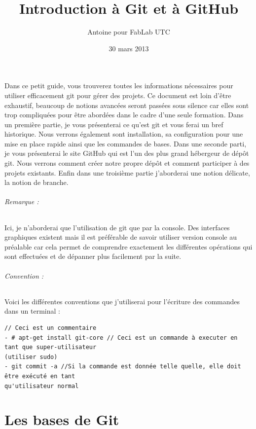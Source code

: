 \documentclass[a4paper]{article}
\title{Introduction à Git et à GitHub}
\author{Antoine \bsc{Wacheux} pour FabLab UTC}
\date{30 mars 2013}
\begin{document}
\maketitle

Dans ce petit guide, vous trouverez toutes les informations nécessaires pour utiliser efficacement git pour gérer des projets. Ce document est loin d'être exhaustif, beaucoup de notions avancées seront passées sous silence car elles sont trop compliquées pour être abordées dans le cadre d'une seule formation. Dans un première partie, je vous présenterai ce qu'est git et vous ferai un bref historique. Nous verrons également sont installation, sa configuration pour une mise en place rapide ainsi que les commandes de bases. Dans une seconde parti, je vous présenterai le site GitHub qui est l'un des plus grand hébergeur de dépôt git. Nous verrons comment créer notre propre dépôt et comment participer à des projets existants. Enfin dans une troisième partie j'aborderai une notion délicate, la notion de branche.

\paragraph{Remarque :} Ici, je n'aborderai que l'utilisation de git que par la console. Des interfaces graphiques existent mais il est préférable de savoir utiliser version console au préalable car cela permet de comprendre exactement les différentes opérations qui sont effectuées et de dépanner plus facilement par la suite. 

\paragraph{Convention :} Voici les différentes conventions que j'utiliserai pour l'écriture des commandes dans un terminal : 

\begin{verbatim}
// Ceci est un commentaire
- # apt-get install git-core // Ceci est un commande à executer en tant que super-utilisateur 
(utiliser sudo)
- git commit -a //Si la commande est donnée telle quelle, elle doit être exécuté en tant 
qu'utilisateur normal
\end{verbatim}

\tableofcontents

\part{Les bases de Git}
\end{document}
